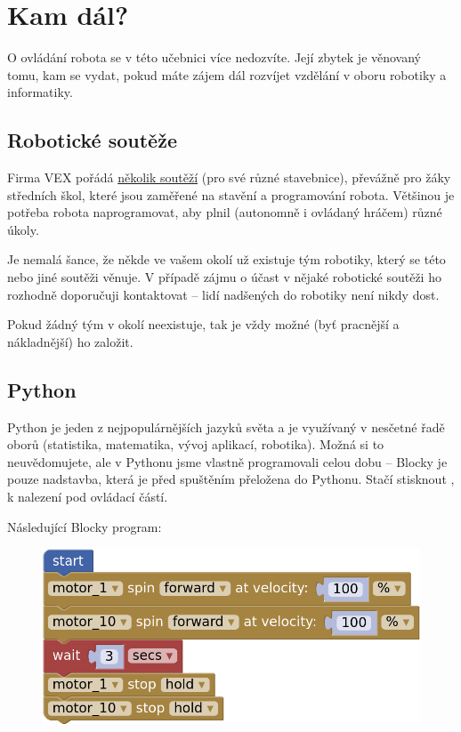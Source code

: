 \documentclass[../main.tex]{subfiles}
\begin{document}
	\section{Kam dál?}
	O ovládání robota se v této učebnici více nedozvíte. Její zbytek je věnovaný tomu, kam se vydat, pokud máte zájem dál rozvíjet vzdělání v oboru robotiky a informatiky.

	\subsection{Robotické soutěže}
	Firma VEX pořádá \href{https://www.vexrobotics.com/competition?___store=vexroboticseu&___from_store=vexrobotics}{několik soutěží} (pro své různé stavebnice), převážně pro žáky středních škol, které jsou zaměřené na stavění a programování robota. Většinou je potřeba robota naprogramovat, aby plnil (autonomně i ovládaný hráčem) různé úkoly.

	Je nemalá šance, že někde ve vašem okolí už existuje tým robotiky, který se této nebo jiné soutěži věnuje. V případě zájmu o účast v nějaké robotické soutěži ho rozhodně doporučuji kontaktovat -- lidí nadšených do robotiky není nikdy dost.

	Pokud žádný tým v okolí neexistuje, tak je vždy možné (byť pracnější a nákladnější) ho založit. 

	\subsection{Python}
	Python je jeden z nejpopulárnějších jazyků světa a je využívaný v nesčetné řadě oborů (statistika, matematika, vývoj aplikací, robotika). Možná si to neuvědomujete, ale v Pythonu jsme vlastně programovali celou dobu -- Blocky je pouze nadstavba, která je před spuštěním přeložena do Pythonu. Stačí stisknout , k nalezení pod ovládací částí.

	Následující Blocky program:

	\begin{figure}[h!]
		\centering
		\begin{minipage}{0.50\textwidth}
			\includegraphics[width=\linewidth]{Images/06/program.png}
		\end{minipage}
	\end{figure}
\end{document}
